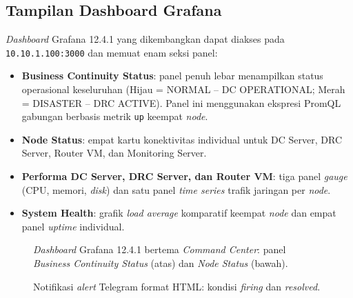 \documentclass[10pt,twocolumn]{article}
\begin{document}
\subsection{Tampilan Dashboard Grafana}

\textit{Dashboard} Grafana 12.4.1 yang dikembangkan dapat diakses pada \texttt{10.10.1.100:3000} dan
memuat enam seksi panel:
\begin{itemize}[leftmargin=*]
  \item \textbf{Business Continuity Status}: panel penuh lebar menampilkan status operasional
        keseluruhan (Hijau = NORMAL -- DC OPERATIONAL; Merah = DISASTER -- DRC ACTIVE). Panel ini
        menggunakan ekspresi PromQL gabungan berbasis metrik \texttt{up} keempat \textit{node}.
  \item \textbf{Node Status}: empat kartu konektivitas individual untuk DC Server, DRC Server, Router
        VM, dan Monitoring Server.
  \item \textbf{Performa DC Server, DRC Server, dan Router VM}: tiga panel \textit{gauge} (CPU,
        memori, \textit{disk}) dan satu panel \textit{time series} trafik jaringan per \textit{node}.
  \item \textbf{System Health}: grafik \textit{load average} komparatif keempat \textit{node} dan
        empat panel \textit{uptime} individual.
\end{itemize}

\begin{figure}[H]
  \centering
  \caption{\textit{Dashboard} Grafana 12.4.1 bertema \textit{Command Center}: panel
           \textit{Business Continuity Status} (atas) dan \textit{Node Status} (bawah).}
  \label{fig:dashboard}
\end{figure}

\begin{figure}[H]
  \centering
  \caption{Notifikasi \textit{alert} Telegram format HTML: kondisi \textit{firing} dan
           \textit{resolved}.}
  \label{fig:telegram-alert}
\end{figure}
\end{document}
